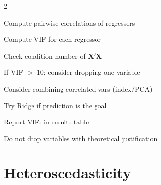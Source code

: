 \documentclass[10pt,a4paper]{article}
\begin{document}
\begin{tcolorbox}[checklist]
\begin{multicols}{2}
\begin{checklist}
  \item Compute pairwise correlations of regressors
  \item Compute VIF for each regressor
  \item Check condition number of $\mathbf{X}'\mathbf{X}$
  \item If VIF $>$ 10: consider dropping one variable
  \item Consider combining correlated vars (index/PCA)
  \item Try Ridge if prediction is the goal
  \item Report VIFs in results table
  \item Do not drop variables with theoretical justification
\end{checklist}
\end{multicols}
\end{tcolorbox}

\newpage

\section{Heteroscedasticity}
\end{document}
